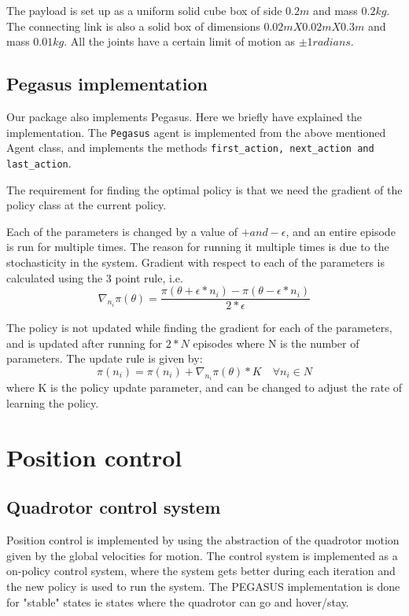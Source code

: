 \documentclass[hidelinks,BTech]{iitmdiss}
\begin{document}
The payload is set up as a uniform solid cube box of side $0.2m$ and mass $0.2kg$. The connecting link is also a solid box of dimensions $0.02m X 0.02m X 0.3m$ and mass $0.01kg$. All the joints have a certain limit of motion as $\pm 1 radians$.

\section{Pegasus implementation}
Our package also implements Pegasus. Here we briefly have explained the implementation. The \texttt{Pegasus} agent is implemented from the above mentioned Agent class, and implements the methods \texttt{first\_action, next\_action and last\_action}.

The requirement for finding the optimal policy is that we need the gradient of the policy class at the current policy. 

Each of the parameters is changed by a value of $+ and -\epsilon$, and an entire episode is run for multiple times. The reason for running it multiple times is due to the stochasticity in the system. Gradient with respect to each of the parameters is calculated using the 3 point rule, i.e.
\begin{equation}
\nabla_{n_i} \pi(\theta) =  \dfrac {\pi(\theta+\epsilon*n_i)-\pi(\theta-\epsilon*n_i)}  {2 * \epsilon}
\end{equation}

The policy is not updated while finding the gradient for each of the parameters, and is updated after running for $2*N$ episodes where N is the number of parameters. The update rule is given by: 
\begin{equation}
\pi(n_i) = \pi(n_i) + \nabla_{n_i} \pi(\theta) * K \quad \forall n_i \in N
\end{equation}
where K is the policy update parameter, and can be changed to adjust the rate of learning the policy.

\chapter{Position control}

\section{Quadrotor control system}
Position control is implemented by using the abstraction of the quadrotor motion given by the global velocities for motion. The control system is implemented as a on-policy control system, where the system gets better during each iteration and the new policy is used to run the system. The PEGASUS implementation is done for "stable" states ie states where the quadrotor can go and hover/stay. 
\end{document}
